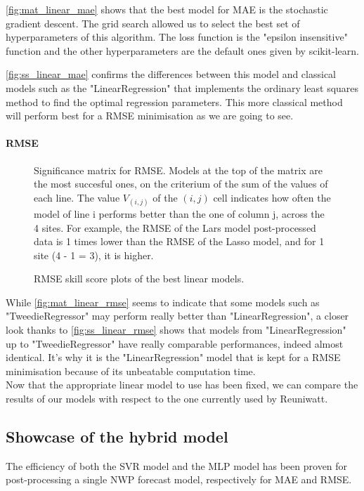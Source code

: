 \autoref{fig:mat_linear_mae} shows that the best model for MAE is the stochastic gradient descent. 
The grid search allowed us to select the best set of hyperparameters of this algorithm.
The loss function is the "epsilon insensitive" function and the other hyperparameters are the default ones given by scikit-learn.

\autoref{fig:ss_linear_mae} confirms the differences between this model and classical models such as the "LinearRegression" that implements the ordinary least squares method to find the optimal regression parameters. This more classical method will perform best for a RMSE minimisation as we are going to see.
\newpage
\paragraph{RMSE}\indent
\begin{figure}[htb!]
    \centering
    
\caption{Significance matrix for RMSE. Models at the top of the matrix are the most succesful ones, on the criterium of the sum of the values of each line. The value $V_{(i,j)}$ of the $(i,j)$ cell indicates how often the model of line i performs better than the one of column j, across the 
4 sites. For example, the RMSE of the Lars model post-processed data is 1 times lower than the RMSE of the Lasso model, and for 1 site (4 - 1 = 3), it is higher.}
\label{fig:mat_linear_rmse}
\end{figure}
\newpage
\begin{figure}[htb!]
    \centering
    
\caption{RMSE skill score plots of the best linear models.}
\label{fig:ss_linear_rmse}
\end{figure}

While \autoref{fig:mat_linear_rmse} seems to indicate that some models such as "TweedieRegressor" may perform really better than "LinearRegression", a closer look thanks to \autoref{fig:ss_linear_rmse} shows that models from "LinearRegression" up to "TweedieRegressor" have really comparable performances, indeed almost identical. It's why it is the "LinearRegression" model that is kept for a RMSE minimisation because of its unbeatable computation time.\\

Now that the appropriate linear model to use has been fixed, we can compare the results of our models with respect to the one currently used by Reuniwatt.  
\newpage
\subsection{Showcase of the hybrid model}
The efficiency of both the SVR model and the MLP model has been proven for post-processing a single NWP forecast model, respectively for MAE and RMSE.

